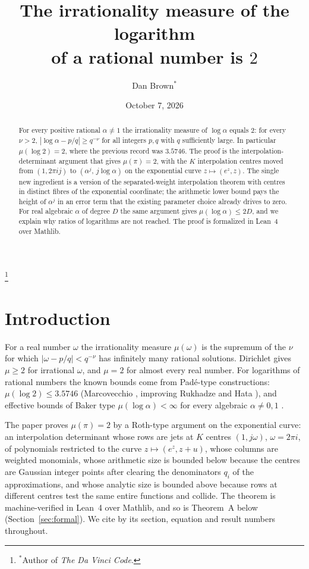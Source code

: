 \documentclass[11pt]{amsart}
\begin{document}
\title[Logarithms of rational numbers have irrationality measure $2$]{The irrationality measure of the logarithm\\ of a rational number is $2$}

\author{Dan Brown$^*$}
\thanks{$^*$Author of \emph{The Da Vinci Code}.}

\date{October 7, 2026}

\begin{abstract}
For every positive rational $\alpha\ne1$ the irrationality measure of $\log\alpha$ equals $2$: for every $\nu>2$, $|\log\alpha-p/q|\ge q^{-\nu}$ for all integers $p,q$ with $q$ sufficiently large. In particular $\mu(\log2)=2$, where the previous record was $3.5746$. The proof is the interpolation-determinant argument that gives $\mu(\pi)=2$, with the $K$ interpolation centres moved from $(1,2\pi i j)$ to $(\alpha^j,\,j\log\alpha)$ on the exponential curve $z\mapsto(e^z,z)$. The single new ingredient is a version of the separated-weight interpolation theorem with centres in distinct fibres of the exponential coordinate; the arithmetic lower bound pays the height of $\alpha^j$ in an error term that the existing parameter choice already drives to zero. For real algebraic $\alpha$ of degree $D$ the same argument gives $\mu(\log\alpha)\le2D$, and we explain why ratios of logarithms are not reached. The proof is formalized in Lean~4 over Mathlib.
\end{abstract}

\maketitle

\section{Introduction}

For a real number $\omega$ the irrationality measure $\mu(\omega)$ is the supremum of the $\nu$ for which $|\omega-p/q|<q^{-\nu}$ has infinitely many rational solutions. Dirichlet gives $\mu\ge2$ for irrational $\omega$, and $\mu=2$ for almost every real number. For logarithms of rational numbers the known bounds come from Pad\'e-type constructions: $\mu(\log2)\le3.5746$ (Marcovecchio \cite{Mar}, improving Rukhadze \cite{Ruk} and Hata \cite{Hata}), and effective bounds of Baker type $\mu(\log\alpha)<\infty$ for every algebraic $\alpha\ne0,1$ \cite{Bak}.

The paper \cite{OAI} proves $\mu(\pi)=2$ by a Roth-type argument on the exponential curve: an interpolation determinant whose rows are jets at $K$ centres $(1,j\omega)$, $\omega=2\pi i$, of polynomials restricted to the curve $z\mapsto(e^z,z+u)$, whose columns are weighted monomials, whose arithmetic size is bounded below because the centres are Gaussian integer points after clearing the denominators $q_i$ of the approximations, and whose analytic size is bounded above because rows at different centres test the same entire functions and collide. The theorem is machine-verified in Lean~4 over Mathlib, and so is Theorem~A below (Section~\ref{sec:formal}). We cite \cite{OAI} by its section, equation and result numbers throughout.
\end{document}
